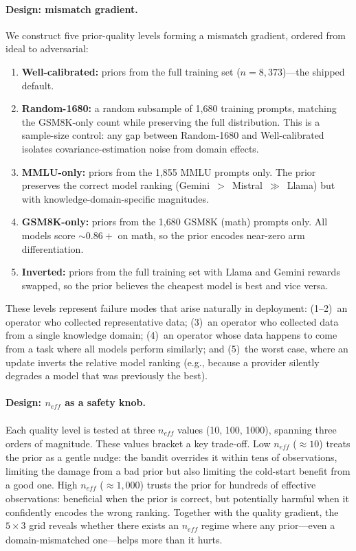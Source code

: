 \paragraph{Design: mismatch gradient.}
We construct five prior-quality levels forming a mismatch gradient,
ordered from ideal to adversarial:
\begin{enumerate}[nosep,leftmargin=*]
  \item \textbf{Well-calibrated:} priors from the full training set
    ($n{=}8{,}373$)---the shipped default.
  \item \textbf{Random-1680:} a random subsample of 1{,}680 training
    prompts, matching the GSM8K-only count while preserving the full
    distribution.  This is a sample-size control: any gap between
    Random-1680 and Well-calibrated isolates covariance-estimation
    noise from domain effects.
  \item \textbf{MMLU-only:} priors from the 1{,}855 MMLU prompts
    only.  The prior preserves the correct model ranking
    (Gemini~$>$~Mistral~$\gg$~Llama) but with
    knowledge-domain-specific magnitudes.
  \item \textbf{GSM8K-only:} priors from the 1{,}680 GSM8K (math)
    prompts only.  All models score ${\sim}0.86{+}$ on math, so the
    prior encodes near-zero arm differentiation.
  \item \textbf{Inverted:} priors from the full training set with
    Llama and Gemini rewards swapped, so the prior believes the
    cheapest model is best and vice versa.
\end{enumerate}
These levels represent failure modes that arise naturally in
deployment: (1--2)~an operator who collected representative data;
(3)~an operator who collected data from a single knowledge domain;
(4)~an operator whose data happens to come from a task where all
models perform similarly; and (5)~the worst case, where an update
inverts the relative model ranking (e.g., because a provider
silently degrades a model that was previously the best).

\paragraph{Design: $n_\mathit{eff}$ as a safety knob.}
Each quality level is tested at three $n_\mathit{eff}$ values
(10, 100, 1000), spanning three orders of magnitude.
These values bracket a key trade-off.
Low $n_\mathit{eff}$ (${\approx}10$) treats the prior as a gentle
nudge: the bandit overrides it within tens of observations,
limiting the damage from a bad prior but also limiting the
cold-start benefit from a good one.
High $n_\mathit{eff}$ (${\approx}1{,}000$) trusts the prior for
hundreds of effective observations: beneficial when the prior is
correct, but potentially harmful when it confidently encodes the
wrong ranking.
Together with the quality gradient, the $5 \times 3$ grid reveals
whether there exists an $n_\mathit{eff}$ regime where any
prior---even a domain-mismatched one---helps more than it hurts.

